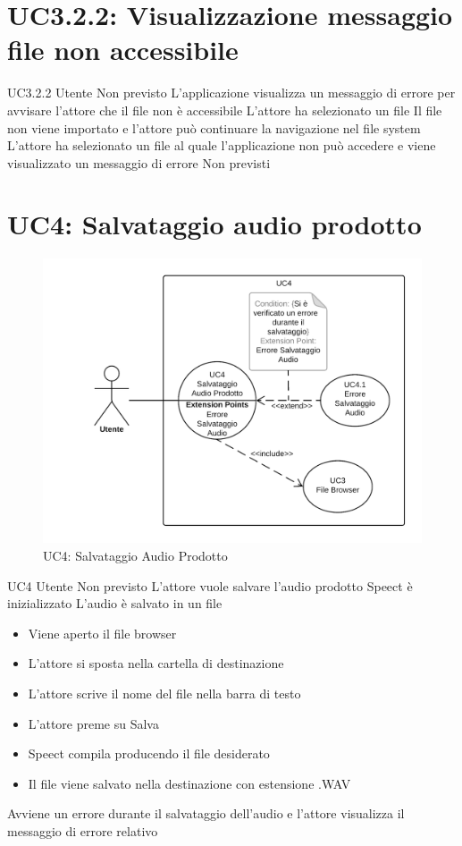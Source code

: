 \documentclass[../AnalisideiRequisiti.tex]{subfiles}
\begin{document}
\section{UC3.2.2: Visualizzazione messaggio file non accessibile}
\UserCase
{UC3.2.2}
{Utente}
{Non previsto}
{L'applicazione visualizza un messaggio di errore per avvisare l'attore che il file non è accessibile}
{L'attore ha selezionato un file }
{Il file non viene importato e l'attore può continuare la navigazione nel file system}
{L'attore ha selezionato un file al quale l'applicazione non può accedere e viene visualizzato un messaggio di errore}
{Non previsti}



\section{UC4: Salvataggio audio prodotto}
\begin{figure}[H]
	\centering
	\includegraphics[width=\textwidth]{../img/UC4.png}
	\caption{UC4: Salvataggio Audio Prodotto}
\end{figure}
\UserCase
{UC4}
{Utente}
{Non previsto}
{L'attore vuole salvare l'audio prodotto}
{Speect è inizializzato }
{L'audio è salvato in un file}
{
		\begin{itemize}
		\item{} Viene aperto il file browser 
		\item{} L'attore si sposta nella cartella di destinazione 
		\item{} L'attore scrive il nome del file nella barra di testo
		\item{} L'attore preme su Salva 
		\item{} Speect compila producendo il file desiderato
		\item{} Il file viene salvato nella destinazione con estensione .WAV
		\end{itemize}
}
{Avviene un errore durante il salvataggio dell'audio e l'attore visualizza il messaggio di errore relativo }
		
\end{document}
